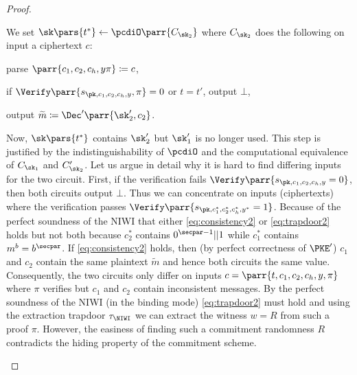 \begin{proof}
\begin{hybrids}
        \item We set \(\sk\pars{t^*} \gets \pcdiO\parr{C_{\sk_2}}\) where \(C_{\sk_2}\) does the following on input a ciphertext \(c\):
        \begin{sitemize}
            \item parse \(\parr{c_1,c_2,c_h,y\pi} \coloneqq c\),
            \item if \(\Verify\parr{s_{\pk,c_1,c_2,c_h,y},\pi} = 0\) or \(t=t'\), output \(\bot\),
            \item output \(\widetilde{m} \coloneqq \Dec'\parr{\sk'_2,c_2}\).
        \end{sitemize}
        Now, \(\sk\pars{t^*}\) contains \(\sk'_2\) but \(\sk'_1\) is no longer used.
        This step is justified by the indistinguishability of \(\pcdiO\) and the computational equivalence of \(C_{\sk_1}\) and \(C'_{\sk_2}\).
        Let us argue in detail why it is hard to find differing inputs for the two circuit.
        First, if the verification fails \(\Verify\parr{s_{\pk,c_1,c_2,c_h,y} = 0}\),
        then both circuits output \(\bot\).
        Thus we can concentrate on inputs (ciphertexts) where the verification passes \(\Verify\parr{s_{\pk,c^*_1,c^*_2,c^*_h,y^*} = 1}\).
        Because of the perfect soundness of the NIWI that either \cref{eq:consistency2} or \cref{eq:trapdoor2} holds but not both because \(c^*_2\) contains \(0^{\secpar-1}||1\) while \(c^*_1\) contains \(m^b = b^\secpar\).
        If \cref{eq:consistency2} holds,
        then (by perfect correctness of \(\PKE'\)) \(c_1\) and \(c_2\) contain the same plaintext \(\widetilde{m}\) and hence both circuits the same value.
        \\
        Consequently, the two circuits only differ on inputs \(c = \parr{t,c_1,c_2,c_h,y,\pi}\) where \(\pi\) verifies but \(c_1\) and \(c_2\) contain inconsistent messages.
        By the perfect soundness of the NIWI (in the binding mode) \cref{eq:trapdoor2} must hold and using the extraction trapdoor \(\tau_\NIWI\) we can extract the witness \(w = R\) from such a proof \(\pi\).
        However, the easiness of finding such a commitment randomness \(R\) contradicts the hiding property of the commitment scheme.


\end{hybrids}
\end{proof}
